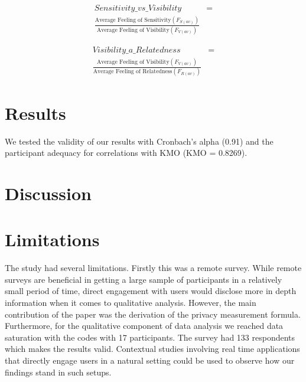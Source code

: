 \documentclass[conference]{IEEEtran}
\begin{document}
 \begin{equation} \label{eq1}
\begin{split}
Sensitivity\_vs\_Visibility & = \\ \frac{\text{Average Feeling of Sensitivity}(F_{S(av)})}{\text{Average Feeling of Visibility}(F_{V(av)}) } 
\end{split}
\end{equation}

 \begin{equation} \label{eq1}
\begin{split}
Visibility\_a\_Relatedness & = \\ \frac{\text{Average Feeling of Visibility}(F_{V(av)}) }{\text{Average Feeling of Relatedness}(F_{R(av)})} 
\end{split}
\end{equation}




\section {Results}

We tested the validity of our results with Cronbach's alpha (0.91) and the participant adequacy for correlations with KMO (KMO =  0.8269). 

\section{Discussion}

\section {Limitations}

The study had several limitations. Firstly this was a remote survey. While remote surveys are beneficial in getting a large sample of participants in a relatively small period of time, direct engagement with users would disclose more in depth information when it comes to qualitative analysis. However, the main contribution of the paper was the derivation of the privacy measurement formula. Furthermore, for the qualitative component of data analysis we reached data saturation with the codes with 17 participants. The survey had 133 respondents which makes the results valid. Contextual studies involving real time applications that directly engage users in a natural setting could be used to observe how our findings stand in such setups.
\end{document}
